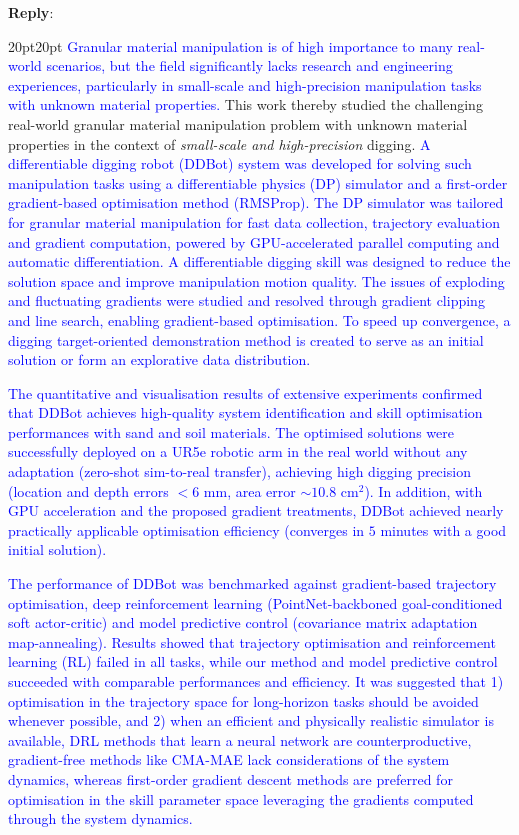 \documentclass[11pt]{article}
\newenvironment{reply}
   {\medskip \noindent \begin{sf}\textbf{Reply}: \  }
   {\medskip \end{sf}}
\newcommand{\xt}[1]{\textcolor{blue}{#1}}
\begin{document}
\begin{reply}
\begin{adjustwidth}{20pt}{20pt}
\xt{Granular material manipulation is of high importance to many real-world scenarios, but the field significantly lacks research and engineering experiences, particularly in small-scale and high-precision manipulation tasks with unknown material properties.} This work thereby studied the challenging real-world granular material manipulation problem with unknown material properties in the context of \textit{small-scale and high-precision} digging. \xt{A differentiable digging robot (DDBot) system was developed for solving such manipulation tasks using a differentiable physics (DP) simulator and a first-order gradient-based optimisation method (RMSProp). The DP simulator was tailored for granular material manipulation for fast data collection, trajectory evaluation and gradient computation, powered by GPU-accelerated parallel computing and automatic differentiation. A differentiable digging skill was designed to reduce the solution space and improve manipulation motion quality. The issues of exploding and fluctuating gradients were studied and resolved through gradient clipping and line search, enabling gradient-based optimisation. To speed up convergence, a digging target-oriented demonstration method is created to serve as an initial solution or form an explorative data distribution.}

\xt{The quantitative and visualisation results of extensive experiments confirmed that DDBot achieves high-quality system identification and skill optimisation performances with sand and soil materials. The optimised solutions were successfully deployed on a UR5e robotic arm in the real world without any adaptation (zero-shot sim-to-real transfer), achieving high digging precision (location and depth errors $<6$ mm, area error $\sim10.8$ cm$^2$). In addition, with GPU acceleration and the proposed gradient treatments, DDBot achieved nearly practically applicable optimisation efficiency (converges in $5$ minutes with a good initial solution).} 

\xt{The performance of DDBot was benchmarked against gradient-based trajectory optimisation, deep reinforcement learning (PointNet-backboned goal-conditioned soft actor-critic) and model predictive control (covariance matrix adaptation map-annealing). Results showed that trajectory optimisation and reinforcement learning (RL) failed in all tasks, while our method and model predictive control succeeded with comparable performances and efficiency. It was suggested that 1) optimisation in the trajectory space for long-horizon tasks should be avoided whenever possible, and 2) when an efficient and physically realistic simulator is available, DRL methods that learn a neural network are counterproductive, gradient-free methods like CMA-MAE lack considerations of the system dynamics, whereas first-order gradient descent methods are preferred for optimisation in the skill parameter space leveraging the gradients computed through the system dynamics.}


\end{adjustwidth}
\end{reply}
\end{document}
